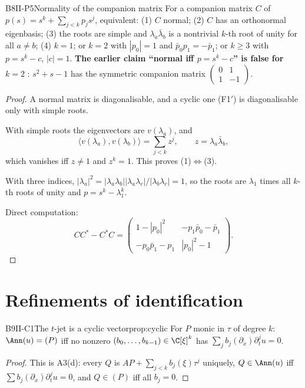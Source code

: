 \begin{dimcard}{B8}{II-P5}{Normality of the companion matrix}{\proved}{}
For a companion matrix $C$ of $p(s)=s^k+\sum_{j<k}p_js^j$, equivalent: (1) $C$ normal; (2) $C$ has an orthonormal eigenbasis; (3) the roots are simple and $\lambda_a\bar\lambda_b$ is a nontrivial $k$-th root of unity for all $a\ne b$; (4) $k=1$; or $k=2$ with $|p_0|=1$ and $\bar p_0p_1=-\bar p_1$; or $k\ge3$ with $p=s^k-c$, $|c|=1$. \textbf{The earlier claim ``normal iff $p=s^k-c$'' is false for $k=2$} \falsest: $s^2+s-1$ has the symmetric companion matrix $\begin{pmatrix}0&1\\1&-1\end{pmatrix}$.
\end{dimcard}
\begin{proof}
A normal matrix is diagonalisable, and a cyclic one (F1$'$) is diagonalisable only with simple roots.

With simple roots the eigenvectors are $v(\lambda_a)$, and
\[
\langle v(\lambda_a),v(\lambda_b)\rangle=\sum_{j<k}z^j,\qquad z=\lambda_a\bar\lambda_b,
\]
which vanishes iff $z\ne1$ and $z^k=1$. This proves (1)$\iff$(3).

With three indices, $|\lambda_a|^2=|\lambda_a\lambda_b||\lambda_a\lambda_c|/|\lambda_b\lambda_c|=1$, so the roots are $\lambda_1$ times all $k$-th roots of unity and $p=s^k-\lambda_1^k$.

Direct computation:
\[
CC^*-C^*C=\begin{pmatrix}1-|p_0|^2&-p_1\bar p_0-\bar p_1\\-p_0\bar p_1-p_1&|p_0|^2-1\end{pmatrix}.
\]
\end{proof}

\section{Refinements of identification}

\begin{dimcard}{B9}{II-C1}{The $t$-jet is a cyclic vector}{\proved}{prop:cyclic}
For $P$ monic in $\tau$ of degree $k$: $\Ann(u)=(P)$ iff no nonzero $(b_0,\dots,b_{k-1})\in\C[\xi]^k$ has $\sum_jb_j(\partial_x)\partial_t^ju=0$.
\end{dimcard}
\begin{proof}
This is A3(d): every $Q$ is $AP+\sum_{j<k}b_j(\xi)\tau^j$ uniquely, $Q\in\Ann(u)$ iff $\sum b_j(\partial_x)\partial_t^ju=0$, and $Q\in(P)$ iff all $b_j=0$.
\end{proof}

